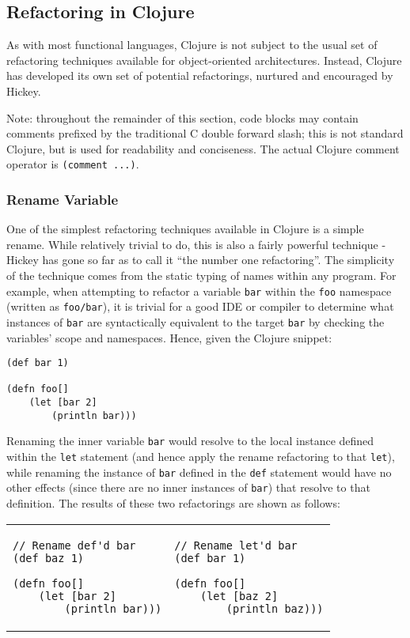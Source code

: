 \subsection{Refactoring in Clojure}

As with most functional languages, Clojure is not subject to the usual set of refactoring techniques available for object-oriented architectures. Instead, Clojure has developed its own set of potential refactorings, nurtured and encouraged by Hickey.

Note: throughout the remainder of this section, code blocks may contain comments prefixed by the traditional C double forward slash; this is not standard Clojure, but is used for readability and conciseness. The actual Clojure comment operator is \verb!(comment ...)!.

\subsubsection{Rename Variable}

One of the simplest refactoring techniques available in Clojure is a simple rename. While relatively trivial to do, this is also a fairly powerful technique - Hickey has gone so far as to call it ``the number one refactoring''\cite{rerefactoring}. The simplicity of the technique comes from the static typing of names within any program. For example, when attempting to refactor a variable \verb!bar! within the \verb!foo! namespace (written as \verb!foo/bar!), it is trivial for a good IDE or compiler to determine what instances of \verb!bar! are syntactically equivalent to the target \verb!bar! by checking the variables' scope and namespaces. Hence, given the Clojure snippet:

\begin{verbatim}
(def bar 1)

(defn foo[]
    (let [bar 2]
        (println bar)))
\end{verbatim}

Renaming the inner variable \verb!bar! would resolve to the local instance defined within the \verb!let! statement (and hence apply the rename refactoring to that \verb!let!), while renaming the instance of \verb!bar! defined in the \verb!def! statement would have no other effects (since there are no inner instances of \verb!bar!) that resolve to that definition. The results of these two refactorings are shown as follows:

\begin{tabular}{m{2in} m{2in}} \\
\begin{verbatim}
// Rename def'd bar
(def baz 1)

(defn foo[]
    (let [bar 2]
        (println bar)))
\end{verbatim}
&
\begin{verbatim}
// Rename let'd bar
(def bar 1)

(defn foo[]
    (let [baz 2]
        (println baz)))
\end{verbatim}
\end{tabular}

